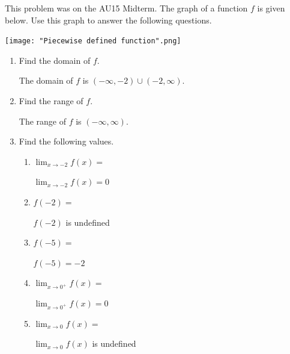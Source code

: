 \documentclass[nooutcomes]{ximera}
\begin{document}
\begin{problem} This problem was on the AU15 Midterm. \hfil
	 The graph of a function $f$ is given below.  Use this graph to answer the following questions.
  \begin{image}
    \texttt{[image: "Piecewise defined function".png]}
  \end{image}

 \begin{enumerate}
    \item
        Find the domain of $f$.
        \begin{freeResponse}
          The domain of $f$ is $(-\infty, -2) \cup (-2, \infty)$.
        \end{freeResponse}


    \item
        Find the range of $f$.
        \begin{freeResponse}
          The range of $f$ is $(-\infty, \infty)$.
        \end{freeResponse}

    \item
      Find the following values.
      \begin{enumerate}
        \item
          $\displaystyle \lim_{x \to -2} f(x) = $
          \begin{freeResponse}
            $\displaystyle \lim_{x \to -2} f(x) = 0$
          \end{freeResponse}

        \item
          $f(-2) = $
          \begin{freeResponse}
            $f(-2)$ is undefined
          \end{freeResponse}


        \item
          $f(-5) = $
          \begin{freeResponse}
            $f(-5) = -2$
          \end{freeResponse}

        \item
          $\displaystyle \lim_{x \to 0^+} f(x) = $
          \begin{freeResponse}
            $\displaystyle \lim_{x \to 0^+} f(x) = 0$
          \end{freeResponse}

        \item
          $\displaystyle \lim_{x \to 0} f(x) = $
          \begin{freeResponse}
            $\displaystyle \lim_{x \to 0} f(x)$ is undefined
          \end{freeResponse}
      \end{enumerate}
  \end{enumerate}

\end{problem}
\end{document}
